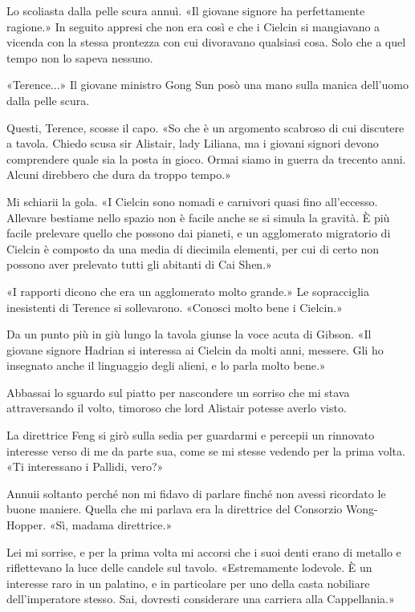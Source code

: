 Lo scoliasta dalla pelle scura annuì. «Il giovane signore ha
perfettamente ragione.» In seguito appresi che non era così e che i
Cielcin si mangiavano a vicenda con la stessa prontezza con cui
divoravano qualsiasi cosa. Solo che a quel tempo non lo sapeva nessuno.

«Terence...» Il giovane ministro Gong Sun posò una mano sulla manica
dell'uomo dalla pelle scura.

Questi, Terence, scosse il capo. «So che è un argomento scabroso di cui
discutere a tavola. Chiedo scusa sir Alistair, lady Liliana, ma i
giovani signori devono comprendere quale sia la posta in gioco. Ormai
siamo in guerra da trecento anni. Alcuni direbbero che dura da troppo
tempo.»

Mi schiarii la gola. «I Cielcin sono nomadi e carnivori quasi fino
all'eccesso. Allevare bestiame nello spazio non è facile anche se si
simula la gravità. È più facile prelevare quello che possono dai
pianeti, e un agglomerato migratorio di Cielcin è composto da una media
di diecimila elementi, per cui di certo non possono aver prelevato tutti
gli abitanti di Cai Shen.»

«I rapporti dicono che era un agglomerato molto grande.» Le sopracciglia
inesistenti di Terence si sollevarono. «Conosci molto bene i Cielcin.»

Da un punto più in giù lungo la tavola giunse la voce acuta di Gibson.
«Il giovane signore Hadrian si interessa ai Cielcin da molti anni,
messere. Gli ho insegnato anche il linguaggio degli alieni, e lo parla
molto bene.»

Abbassai lo sguardo sul piatto per nascondere un sorriso che mi stava
attraversando il volto, timoroso che lord Alistair potesse averlo visto.

La direttrice Feng si girò sulla sedia per guardarmi e percepii un
rinnovato interesse verso di me da parte sua, come se mi stesse vedendo
per la prima volta. «Ti interessano i Pallidi, vero?»

Annuii soltanto perché non mi fidavo di parlare finché non avessi
ricordato le buone maniere. Quella che mi parlava era la direttrice del
Consorzio Wong-Hopper. «Sì, madama direttrice.»

Lei mi sorrise, e per la prima volta mi accorsi che i suoi denti erano
di metallo e riflettevano la luce delle candele sul tavolo.
«Estremamente lodevole. È un interesse raro in un palatino, e in
particolare per uno della casta nobiliare dell'imperatore stesso. Sai,
dovresti considerare una carriera alla Cappellania.»


